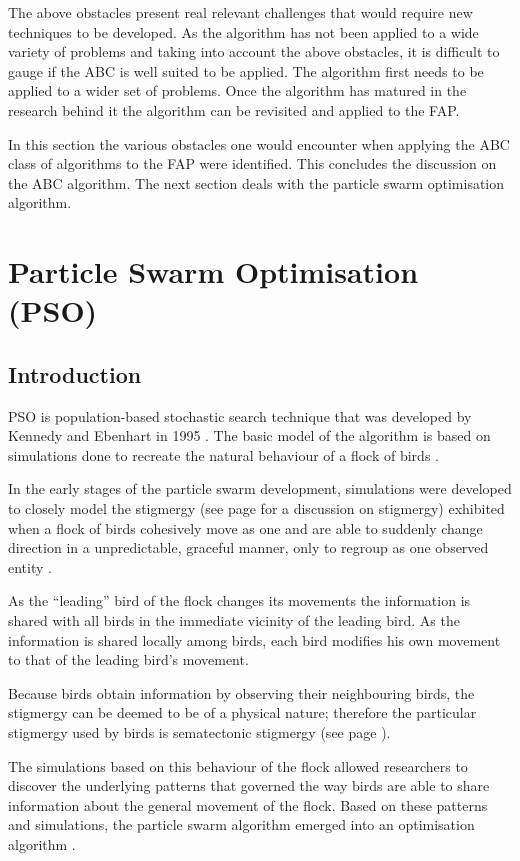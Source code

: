 The above obstacles present real relevant challenges that would require new techniques to be developed. As the algorithm has not been applied to a wide variety of problems and taking into account the above obstacles, it is difficult to gauge if the \gls{ABC} is well suited to be applied. The algorithm first needs to be applied to a wider set of problems. Once the algorithm has matured in the research behind it the algorithm can be revisited and applied to the \gls{FAP}.

In this section the various obstacles one would encounter when applying the \gls{ABC} class of algorithms to the \gls{FAP} were identified. This concludes the discussion on the \gls{ABC} algorithm. The next section deals with the particle swarm optimisation algorithm.
\section{Particle Swarm Optimisation (PSO)}

\label{sec:PSO}
\subsection{Introduction}
\label{sec:psointro}
PSO is population-based stochastic search technique that was developed by Kennedy and Ebenhart in 1995 \cite{PSOGABreeding}. The basic model of the algorithm is based on simulations done to recreate the natural behaviour of a flock of birds \cite{PSOSoftTesting}.

In the early stages of the particle swarm development, simulations were developed to closely model the stigmergy (see page \pageref{sec:stigmergy} for a discussion on stigmergy) exhibited when a flock of birds cohesively move as one and are able to suddenly change direction in a unpredictable, graceful manner, only to regroup as one observed entity \cite{PSOHybridJobShop}. 

As the ``leading'' bird of the flock changes its movements the information is shared with all birds in the immediate vicinity of the leading bird. As the information is shared locally among birds, each bird modifies his own movement to that of the leading bird's movement\cite{PSOHybridJobShop}. 

Because birds obtain information by observing their neighbouring birds, the stigmergy can be deemed to be of a physical nature; therefore the particular stigmergy used by birds is sematectonic stigmergy (see page \pageref{def:sematectonic}).

The simulations based on this behaviour of the flock allowed researchers to discover the underlying patterns that governed the way birds are able to share information about the general movement of the flock. Based on these patterns and simulations, the particle swarm algorithm emerged into an optimisation algorithm \cite{CompuIntelligenceIntro}.

